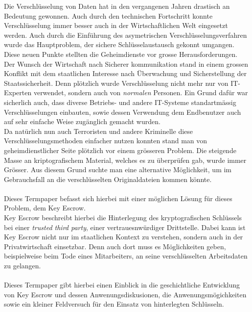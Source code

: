 Die Verschlüsselung von Daten hat in den vergangenen Jahren drastisch an Bedeutung gewonnen. Auch durch den technischen Fortschritt konnte Verschlüsselung immer besser auch in der Wirtschaftlichen Welt eingesetzt werden. Auch durch die Einführung des asymetrischen Verschlüsselungsverfahren wurde das Hauptproblem, der sichere Schlüsselaustausch gekonnt umgangen. \\
Diese neuen Punkte stellten die Geheimdienste vor grosse Herausforderungen. Der Wunsch der Wirtschaft nach Sicherer kommunikation stand in einem grossen Konflikt mit dem staatlichen Interesse nach Überwachung und Sicherstellung der Staatssicherheit. Denn plötzlich wurde Verschlüsselung nicht mehr nur von IT-Experten verwendet, sondern auch von \textit{normalen} Personen. Ein Grund dafür war sicherlich auch, dass diverse Betriebs- und andere IT-Systeme standartmässig Verschlüsselungen einbauten, sowie dessen Verwendung dem Endbenutzer auch auf sehr einfache Weise zugänglich gemacht wurden. \\
Da natürlich nun auch Terroristen und andere Kriminelle diese Verschlüsselungsmethoden einfacher nutzen konnten stand man von geheimdienstlicher Seite plötzlich vor einem grösseren Problem. Die steigende Masse an kriptografischem Material, welches es zu überprüfen gab, wurde immer Grösser. Aus diesem Grund suchte man eine alternative Möglichkeit, um im Gebrauchsfall an die verschlüsselten Originaldateien kommen könnte. \\
\\
Dieses Termpaper befasst sich hierbei mit einer möglichen Lösung für dieses Problem, dem Key Escrow.\\
Key Escrow beschreibt hierbei die Hinterlegung des kryptografischen Schlüssels bei einer \textit{trusted third party}, einer vertrauesnwürdiger Drittstelle. Dabei kann ist Key Escrow nicht nur im staatlichen Kontext zu verstehen, sondern auch in der Privatwirtschaft einsetzbar. Denn auch dort muss es Möglichkeiten geben, beispielweise beim Tode eines Mitarbeiters, an seine verschlüsselten Arbeitsdaten zu gelangen. \\
\\
Dieses Termpaper gibt hierbei einen Einblick in die geschichtliche Entwicklung von Key Escrow und dessen Anwenungsdiskusionen, die Anwenungsmögichkeiten sowie ein kleiner Feldversuch für den Einsatz von hinterlegten Schlüsseln.

